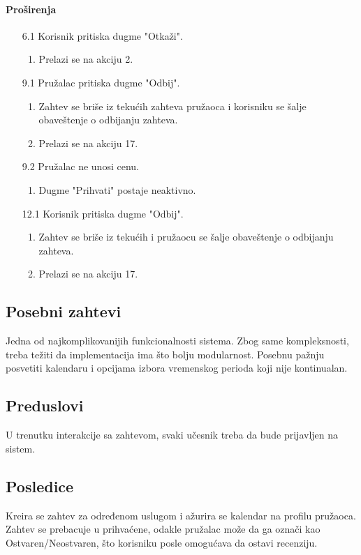 \documentclass[a4paper,12pt]{report}
\begin{document}
			\paragraph*{Proširenja}
				\begin{enumerate}
					\item[6.1] Korisnik pritiska dugme "Otkaži".
						\begin{enumerate}[noitemsep,topsep=-8pt]
							\item Prelazi se na akciju 2.
						\end{enumerate}
					\item[9.1] Pružalac pritiska dugme "Odbij".
						\begin{enumerate}[noitemsep,topsep=-8pt]
							\item Zahtev se briše iz tekućih zahteva pružaoca i korisniku se šalje obaveštenje o odbijanju zahteva.
							\item Prelazi se na akciju 17.
						\end{enumerate}
					\item[9.2] Pružalac ne unosi cenu.
						\begin{enumerate}[noitemsep,topsep=-8pt]
							\item Dugme "Prihvati" postaje neaktivno.
						\end{enumerate}
					\item[12.1] Korisnik pritiska dugme "Odbij".
						\begin{enumerate}[noitemsep,topsep=-8pt]
							\item Zahtev se briše iz tekućih i pružaocu se šalje obaveštenje o odbijanju zahteva.
							\item Prelazi se na akciju 17.
						\end{enumerate}
				\end{enumerate}
		\subsection{Posebni zahtevi}
		    Jedna od najkomplikovanijih funkcionalnosti sistema.
		    Zbog same kompleksnosti, treba težiti da implementacija ima što bolju modularnost.
		    Posebnu pažnju posvetiti kalendaru i opcijama izbora vremenskog perioda koji nije kontinualan.
		\subsection{Preduslovi}
			U trenutku interakcije sa zahtevom, svaki učesnik treba da bude prijavljen na sistem.
		\subsection{Posledice}
			Kreira se zahtev za određenom uslugom i ažurira se kalendar na profilu pružaoca.
			Zahtev se prebacuje u prihvaćene, odakle pružalac može da ga označi kao Ostvaren/Neostvaren, što korisniku posle omogućava da ostavi recenziju.
\end{document}
